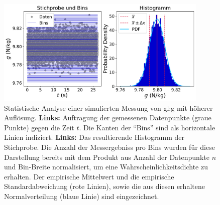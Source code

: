 \begin{figure}[H]
\centering
\includegraphics[width=0.9\textwidth]{Figures/messfehler2.pdf}
\caption{Statistische Analyse einer simulierten Messung von \gls{gl:g} mit höherer Auflösung. \textbf{Links:} Auftragung der gemessenen Datenpunkte (graue Punkte) gegen die Zeit $t$. Die Kanten der ``Bins'' sind als horizontale Linien indiziert.   \textbf{Links:} Das resultierende Histogramm der Stichprobe. Die Anzahl der Messergebniss pro Bins wurden für diese Darstellung bereits mit dem Produkt aus Anzahl der Datenpunkte $n$ und Bin-Breite normalisiert, um eine Wahrscheinlichkeitsdichte zu erhalten. Der empirische Mittelwert und die empirische Standardabweichung (rote Linien), sowie die aus diesen erhaltene Normalverteilung (blaue Linie) sind eingezeichnet.}
\label{fig:messfehler2}
\end{figure}



